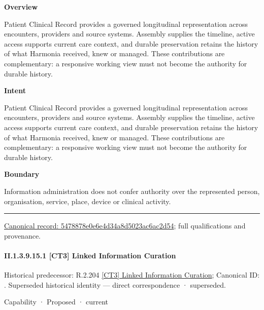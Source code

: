 \textbf{Overview}



Patient Clinical Record provides a governed longitudinal representation across encounters, providers and source systems. Assembly supplies the timeline, active access supports current care context, and durable preservation retains the history of what Harmonia received, knew or managed. These contributions are complementary: a responsive working view must not become the authority for durable history.



\textbf{Intent}



Patient Clinical Record provides a governed longitudinal representation across encounters, providers and source systems. Assembly supplies the timeline, active access supports current care context, and durable preservation retains the history of what Harmonia received, knew or managed. These contributions are complementary: a responsive working view must not become the authority for durable history.



\textbf{Boundary}



Information administration does not confer authority over the represented person, organisation, service, place, device or clinical activity.



\medskip\hrule\medskip

{\footnotesize \href{../../../../../../../continuum/strategy/capability/5478878e0e6e4d34a8d5023ac6ac2d54.md}{Canonical record: 5478878e0e6e4d34a8d5023ac6ac2d54}; full qualifications and provenance.}\par
\paragraph*{II.1.3.9.15.1 [CT3] Linked Information Curation}
\label{navigation:II.1.3.9.15.1}

{\small Historical predecessor: R.2.204 \hyperref[element:9d0925bb39664a5985cacf3cea7442d1]{[CT3] Linked Information Curation}; Canonical ID: \texttt{}. Superseded historical identity — direct correspondence · superseded.}\par
\label{element:5edb2a8b5ee54ddda8104d1fab323a94}
{\small Capability · Proposed · current}\par

